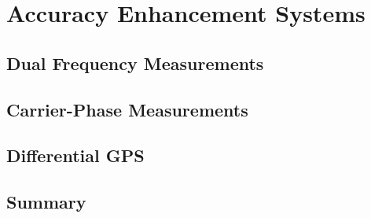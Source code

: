 \chapter{Accuracy Enhancement Systems}


\section{Dual Frequency Measurements}

\section{Carrier-Phase Measurements}

\section{Differential GPS}

\section{Summary}
